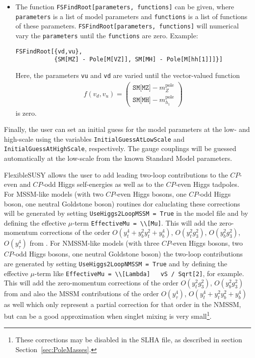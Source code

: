 \documentclass[final,3p,11pt,pdflatex]{elsarticle}
\makeatletter
\newcommand{\fs}{FlexibleSUSY\@\xspace}
\newcommand{\code}[1]{\lstinline|#1|}  %
\newcommand{\pole}{\text{pole}}
\newcommand{\secref}[1]{Section~\ref{#1}}
\makeatother
\begin{document}
\begin{itemize}
\item The function \code{FSFindRoot[parameters, functions]} can be
  given, where \code{parameters} is a list of model parameters and
  \code{functions} is a list of functions of these parameters.
  \code{FSFindRoot[parameters, functions]} will numerical vary the
  \code{parameters} until the \code{functions} are zero.  Example:
  \begin{lstlisting}
FSFindRoot[{vd,vu},
           {SM[MZ] - Pole[M[VZ]], SM[MH] - Pole[M[hh[1]]]}]
  \end{lstlisting}
  Here, the parameters \code{vu} and \code{vd} are varied until the
  vector-valued function
  \begin{align}
    f(v_d,v_u) =
    \begin{pmatrix}
      \texttt{SM[MZ]} - m_Z^\pole \\
      \texttt{SM[MH]} - m_{h_1}^\pole
    \end{pmatrix}
  \end{align}
  is zero.
\end{itemize}
%
Finally, the user can set an initial guess for the model parameters at
the low- and high-scale using the variables
\code{InitialGuessAtLowScale} and \code{InitialGuessAtHighScale},
respectively.  The gauge couplings will be guessed automatically at
the low-scale from the known Standard Model parameters.

\fs allows the user to add leading two-loop contributions to the
$CP$-even and $CP$-odd Higgs self-energies as well as to the $CP$-even Higgs
tadpoles.  For MSSM-like models (with two $CP$-even Higgs bosons, one
$CP$-odd Higgs boson, one neutral Goldstone boson) routines dor
caluclating these corrections will be generated by setting
\code{UseHiggs2LoopMSSM = True} in the model file and by defining the
effective $\mu$-term \code{EffectiveMu = \\[Mu]}.  This will add the
zero-momentum corrections of the order $O(y_t^4 + y_b^2 y_t^2 +
y_b^4)$, $O(y_t^2 g_3^2)$, $O(y_b^2 g_3^2)$, $O(y_\tau^4)$ from
\cite{Degrassi:2001yf,Brignole:2001jy,Dedes:2002dy,Brignole:2002bz,Dedes:2003km}.
For NMSSM-like models (with three $CP$-even Higgs bosons, two $CP$-odd
Higgs bosons, one neutral Goldstone boson) the two-loop contributions
are generated by setting \code{UseHiggs2LoopNMSSM = True} and by
defining the effective $\mu$-term like \code{EffectiveMu = \\[Lambda]
  vS / Sqrt[2]}, for example.  This will add the zero-momentum
corrections of the order $O(y_t^2 g_3^2)$, $O(y_b^2 g_3^2)$ from
\cite{Degrassi:2009yq} and also the MSSM contributions of the order
$O(y_\tau^4)$, $O(y_t^4 + y_t^2 y_b^2 + y_b^4)$ as well
\cite{Brignole:2001jy,Dedes:2003km} which only represent a partial
correction for that order in the NMSSM, but can be a good
approximation when singlet mixing is very small\footnote{These
  corrections may be disabled in the SLHA file, as described in
  section \secref{sec:PoleMasses}.}.
\end{document}
